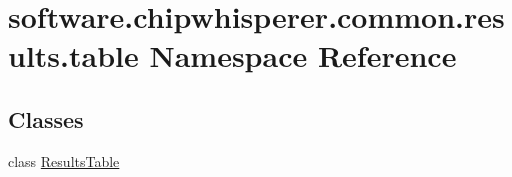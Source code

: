 \hypertarget{namespacesoftware_1_1chipwhisperer_1_1common_1_1results_1_1table}{}\section{software.\+chipwhisperer.\+common.\+results.\+table Namespace Reference}
\label{namespacesoftware_1_1chipwhisperer_1_1common_1_1results_1_1table}
\subsection*{Classes}
\begin{DoxyCompactItemize}
\item 
class \hyperlink{classsoftware_1_1chipwhisperer_1_1common_1_1results_1_1table_1_1ResultsTable}{Results\+Table}
\end{DoxyCompactItemize}
